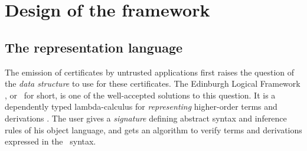 \documentclass{llncs}
\begin{document}
\section{Design of the framework}

\subsection{The representation language}
\label{sec:repr}

The emission of certificates by untrusted applications first raises
the question of the \emph{data structure} to use for these
certificates. %
The Edinburgh Logical Framework \cite{harper1993framework}, or \LF\
for short, is one of the well-accepted solutions to this question. It
is a dependently typed lambda-calculus for \emph{representing}
higher-order terms and derivations \cite{pfenning1988higher}. The user
gives a \emph{signature} defining abstract syntax and inference rules
of his object language, and gets an algorithm to verify terms and
derivations expressed in the \LF\ syntax.
\end{document}
